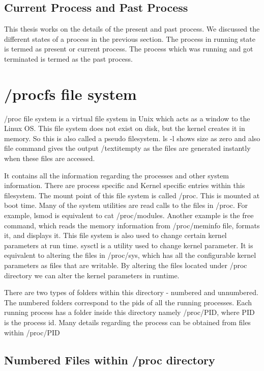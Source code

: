 \documentclass[12pt]{report}
\begin{document}
\subsection{Current Process and Past Process}

This thesis works on the details of the present and past process. We discussed the different states of a process in the previous section. The process in running state is termed as present or current process. The process which was running and got terminated is termed as the past process.

\section{/procfs file system}


/proc file system is a virtual file system in Unix which acts as a window to the Linux OS. This file system does not exist on disk, but the kernel creates it in memory. So this is also called a pseudo filesystem. ls -l shows size as zero and also file command gives the output /textit{empty} as the files are generated instantly when these files are accessed. 


It contains all the information regarding the processes and other system information. There are process specific and Kernel specific entries within this filesystem. The mount point of this file system is called /proc. This is mounted at boot time. 
Many of the system utilities are read
calls to the files in /proc. For example, lsmod is equivalent to cat /proc/modules. Another example is the free command, which reads the memory information from /proc/meminfo file, formats it, and displays it. This file system is also used to change certain kernel parameters at run time.
sysctl is a utility used to change kernel parameter. It  
is
equivalent to altering the files in
/proc/sys, which has all the configurable
kernel parameters as files that are writable. By altering the files located under /proc directory we can alter the kernel parameters in runtime.

There are two types of folders within this directory - numbered and unnumbered. The numbered folders correspond to the pids of all the running processes. Each running process has a folder inside this directory namely /proc/PID, where PID is the process id. Many details regarding the process can be obtained from files within /proc/PID


\subsection{Numbered Files within /proc directory}
\end{document}
